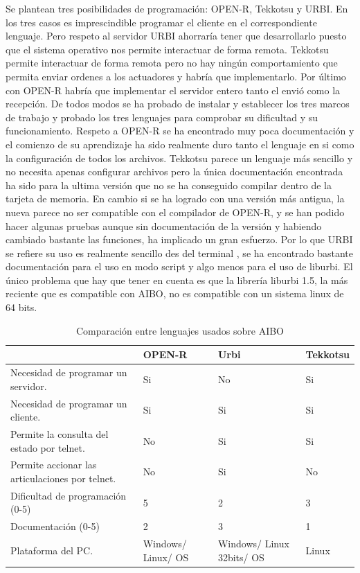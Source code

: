 \documentclass[12pt,a4paper,final,twoside]{book}
\begin{document}
Se plantean tres posibilidades de programación: OPEN-R, Tekkotsu y URBI.
En los tres casos es imprescindible programar el cliente en el correspondiente lenguaje. Pero respeto al servidor URBI ahorraría tener que desarrollarlo puesto que el sistema operativo nos permite interactuar de forma remota. Tekkotsu permite interactuar de forma remota pero no hay ningún comportamiento que permita enviar ordenes a los actuadores y habría que implementarlo. Por último con OPEN-R habría que implementar el servidor entero tanto el envió como la recepción. 
De todos modos se ha probado de instalar y establecer los tres marcos de trabajo y probado los tres lenguajes para comprobar su dificultad y su funcionamiento. Respeto a OPEN-R se ha encontrado muy poca documentación y el comienzo de su aprendizaje ha sido realmente duro tanto el lenguaje en si como la configuración de todos los archivos. Tekkotsu parece un lenguaje más sencillo y no necesita apenas configurar archivos pero la única documentación encontrada ha sido para la ultima versión que no se ha conseguido compilar dentro de la tarjeta de memoria. En cambio si se ha logrado con una versión más antigua, la nueva parece no ser compatible con el compilador de OPEN-R, y se han podido hacer algunas pruebas aunque sin documentación de la versión y habiendo cambiado bastante las funciones, ha implicado un gran esfuerzo. 
Por lo que URBI se refiere su uso es realmente sencillo des del terminal , se ha encontrado bastante documentación para el uso en modo script y algo menos para el uso de liburbi. El único problema que hay que tener en cuenta es que la librería liburbi 1.5, la más reciente que es compatible con  AIBO, no es compatible con un sistema linux de 64 bits. 

\begin{table}[H]
\begin{center}
\begin{tabulary}{\textwidth}{|p{5cm}|p{2.5cm}|p{2.5cm}|p{2.5cm}|}
\hline

& \textbf{OPEN-R}
& \textbf{Urbi} 
& \textbf{Tekkotsu} \\\hline
Necesidad de programar un servidor.
& Si
& No
& Si \\ \hline
Necesidad de programar un cliente.
& Si
& Si
& Si\\ \hline
Permite la consulta del estado por telnet.
& No
& Si
& Si\\ \hline
Permite accionar las articulaciones por telnet.
& No
& Si
& No\\ \hline
Dificultad de programación (0-5)
& 5
& 2 
& 3\\ \hline
Documentación (0-5)
& 2
& 3
& 1\\ \hline
Plataforma del PC.
& Windows/ Linux/ OS
& Windows/ Linux 32bits/ OS
& Linux\\ \hline
\end{tabulary}
\end{center}
\caption{Comparación entre lenguajes usados sobre AIBO\label{complleng}}
\end{table}
\end{document}
